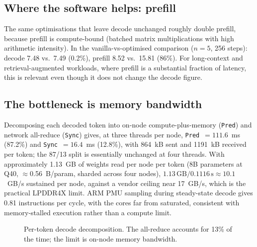 \documentclass[10pt,a4paper]{article}
\begin{document}
\subsection{Where the software helps: prefill}
The same optimisations that leave decode unchanged roughly double prefill, because prefill is compute-bound (batched matrix multiplications with high arithmetic intensity). In the vanilla-vs-optimised comparison ($n{=}5$, 256 steps): decode 7.48 vs.\ 7.49 (0.2\%), prefill 8.52 vs.\ 15.81 (86\%). For long-context and retrieval-augmented workloads, where prefill is a substantial fraction of latency, this is relevant even though it does not change the decode figure.

\subsection{The bottleneck is memory bandwidth}
\label{sec:bottleneck}
Decomposing each decoded token into on-node compute-plus-memory (\texttt{Pred}) and network all-reduce (\texttt{Sync}) gives, at three threads per node, \texttt{Pred}~$=111.6$~ms (87.2\%) and \texttt{Sync}~$=16.4$~ms (12.8\%), with 864~kB sent and 1191~kB received per token; the 87/13 split is essentially unchanged at four threads. With approximately 1.13~GB of weights read per node per token (8B parameters at Q40, $\approx$0.56~B/param, sharded across four nodes), $1.13\,\text{GB}/0.1116\,\text{s}\approx 10.1$~GB/s sustained per node, against a vendor ceiling near 17~GB/s, which is the practical LPDDR4X limit. ARM PMU sampling during steady-state decode gives 0.81 instructions per cycle, with the cores far from saturated, consistent with memory-stalled execution rather than a compute limit.

\begin{figure}[H]
\centering
{}
\caption{Per-token decode decomposition. The all-reduce accounts for 13\% of the time; the limit is on-node memory bandwidth.}
\label{fig:bottleneck}
\end{figure}
\end{document}
